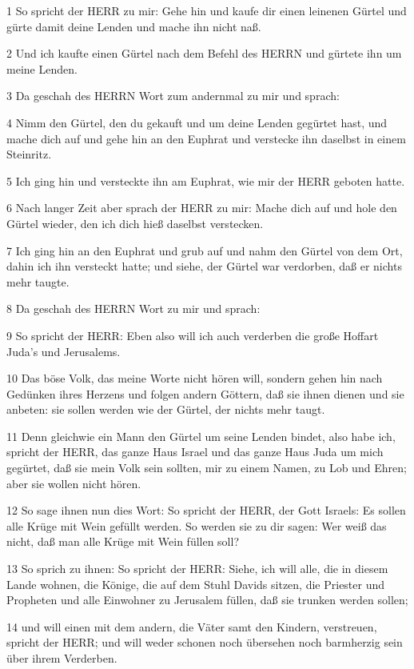 \par 1 So spricht der HERR zu mir: Gehe hin und kaufe dir einen leinenen Gürtel und gürte damit deine Lenden und mache ihn nicht naß.
\par 2 Und ich kaufte einen Gürtel nach dem Befehl des HERRN und gürtete ihn um meine Lenden.
\par 3 Da geschah des HERRN Wort zum andernmal zu mir und sprach:
\par 4 Nimm den Gürtel, den du gekauft und um deine Lenden gegürtet hast, und mache dich auf und gehe hin an den Euphrat und verstecke ihn daselbst in einem Steinritz.
\par 5 Ich ging hin und versteckte ihn am Euphrat, wie mir der HERR geboten hatte.
\par 6 Nach langer Zeit aber sprach der HERR zu mir: Mache dich auf und hole den Gürtel wieder, den ich dich hieß daselbst verstecken.
\par 7 Ich ging hin an den Euphrat und grub auf und nahm den Gürtel von dem Ort, dahin ich ihn versteckt hatte; und siehe, der Gürtel war verdorben, daß er nichts mehr taugte.
\par 8 Da geschah des HERRN Wort zu mir und sprach:
\par 9 So spricht der HERR: Eben also will ich auch verderben die große Hoffart Juda's und Jerusalems.
\par 10 Das böse Volk, das meine Worte nicht hören will, sondern gehen hin nach Gedünken ihres Herzens und folgen andern Göttern, daß sie ihnen dienen und sie anbeten: sie sollen werden wie der Gürtel, der nichts mehr taugt.
\par 11 Denn gleichwie ein Mann den Gürtel um seine Lenden bindet, also habe ich, spricht der HERR, das ganze Haus Israel und das ganze Haus Juda um mich gegürtet, daß sie mein Volk sein sollten, mir zu einem Namen, zu Lob und Ehren; aber sie wollen nicht hören.
\par 12 So sage ihnen nun dies Wort: So spricht der HERR, der Gott Israels: Es sollen alle Krüge mit Wein gefüllt werden. So werden sie zu dir sagen: Wer weiß das nicht, daß man alle Krüge mit Wein füllen soll?
\par 13 So sprich zu ihnen: So spricht der HERR: Siehe, ich will alle, die in diesem Lande wohnen, die Könige, die auf dem Stuhl Davids sitzen, die Priester und Propheten und alle Einwohner zu Jerusalem füllen, daß sie trunken werden sollen;
\par 14 und will einen mit dem andern, die Väter samt den Kindern, verstreuen, spricht der HERR; und will weder schonen noch übersehen noch barmherzig sein über ihrem Verderben.
